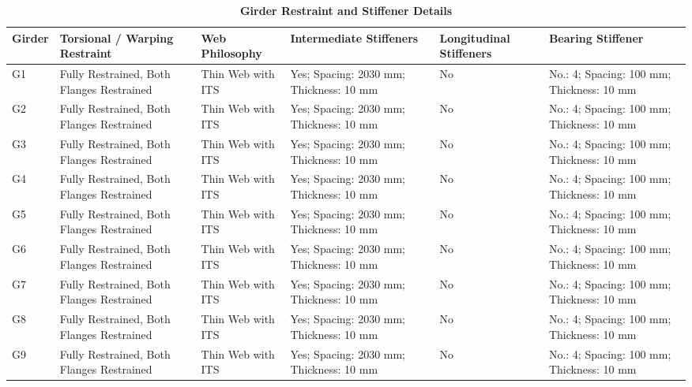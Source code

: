 \documentclass[12pt,a4paper]{report}
\numberwithin{table}{chapter}
\numberwithin{figure}{chapter}
\begin{document}
\vspace{0.6em}

\vspace{4pt}
\begin{longtable}{|L{1.4cm}|p{2.2cm}|p{2.2cm}|p{3.0cm}|p{2.4cm}|p{2.2cm}|}
\caption{\textbf{Girder Restraint and Stiffener Details}}\\
\hline
\textbf{Girder} & \textbf{Torsional / Warping Restraint} & \textbf{Web Philosophy} & \textbf{Intermediate Stiffeners} & \textbf{Longitudinal Stiffeners} & \textbf{Bearing Stiffener} \\[6pt]
\hline
\endfirsthead
\endhead

G1 & Fully Restrained, Both Flanges Restrained & Thin Web with ITS & Yes; Spacing: 2030 mm; Thickness: 10 mm & No & No.: 4; Spacing: 100 mm; Thickness: 10 mm \\[8pt]
\hline
G2 & Fully Restrained, Both Flanges Restrained & Thin Web with ITS & Yes; Spacing: 2030 mm; Thickness: 10 mm & No & No.: 4; Spacing: 100 mm; Thickness: 10 mm \\[8pt]
\hline
G3 & Fully Restrained, Both Flanges Restrained & Thin Web with ITS & Yes; Spacing: 2030 mm; Thickness: 10 mm & No & No.: 4; Spacing: 100 mm; Thickness: 10 mm \\[8pt]
\hline
G4 & Fully Restrained, Both Flanges Restrained & Thin Web with ITS & Yes; Spacing: 2030 mm; Thickness: 10 mm & No & No.: 4; Spacing: 100 mm; Thickness: 10 mm \\[8pt]
\hline
G5 & Fully Restrained, Both Flanges Restrained & Thin Web with ITS & Yes; Spacing: 2030 mm; Thickness: 10 mm & No & No.: 4; Spacing: 100 mm; Thickness: 10 mm \\[8pt]
\hline
G6 & Fully Restrained, Both Flanges Restrained & Thin Web with ITS & Yes; Spacing: 2030 mm; Thickness: 10 mm & No & No.: 4; Spacing: 100 mm; Thickness: 10 mm \\[8pt]
\hline
G7 & Fully Restrained, Both Flanges Restrained & Thin Web with ITS & Yes; Spacing: 2030 mm; Thickness: 10 mm & No & No.: 4; Spacing: 100 mm; Thickness: 10 mm \\[8pt]
\hline
G8 & Fully Restrained, Both Flanges Restrained & Thin Web with ITS & Yes; Spacing: 2030 mm; Thickness: 10 mm & No & No.: 4; Spacing: 100 mm; Thickness: 10 mm \\[8pt]
\hline
G9 & Fully Restrained, Both Flanges Restrained & Thin Web with ITS & Yes; Spacing: 2030 mm; Thickness: 10 mm & No & No.: 4; Spacing: 100 mm; Thickness: 10 mm \\[8pt]
\hline
\end{longtable}
\end{document}

